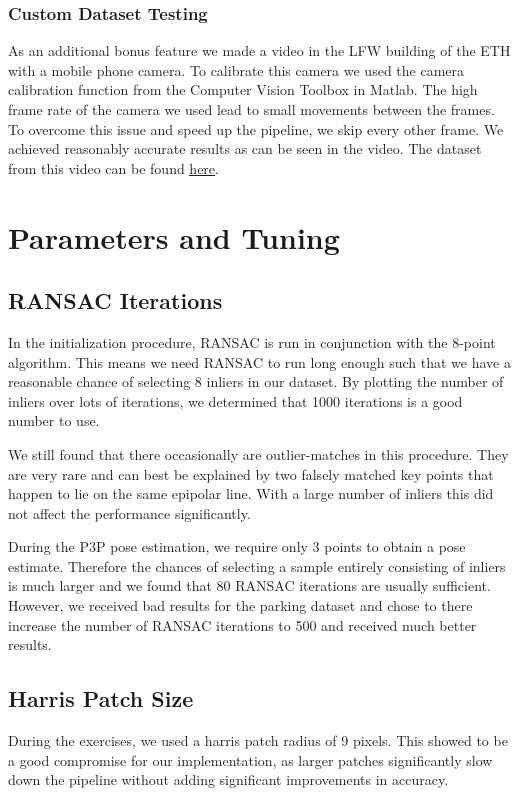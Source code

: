 \documentclass[11pt]{article}
\begin{document}
\subsubsection{Custom Dataset Testing}
As an additional bonus feature we made a video in the LFW building of the ETH with a mobile phone camera. To calibrate this camera we used the camera calibration function from the Computer Vision Toolbox in Matlab. The high frame rate of the camera we used lead to small movements between the frames. To overcome this issue and speed up the pipeline, we skip every other frame. We achieved reasonably accurate results as can be seen in the video. The dataset from this video can be found \href{https://www.dropbox.com/sh/mhrpmllsdomer5p/AABb7Gz0JGaK-FXOYEMNzeGfa?dl=0}{\underline{here}}.

\section{Parameters and Tuning}
\subsection{RANSAC Iterations}
In the initialization procedure, RANSAC is run in conjunction with the 8-point algorithm. This means we need RANSAC to run long enough such that we have a reasonable chance of selecting 8 inliers in our dataset. By plotting the number of inliers over lots of iterations, we determined that 1000 iterations is a good number to use.

We still found that there occasionally are outlier-matches in this procedure. They are very rare and can best be explained by two falsely matched key points that happen to lie on the same epipolar line. With a large number of inliers this did not affect the performance significantly.

During the P3P pose estimation, we require only 3 points to obtain a pose estimate. Therefore the chances of selecting a sample entirely consisting of inliers is much larger and we found that 80 RANSAC iterations are usually sufficient. However, we received bad results for the parking dataset and chose to there increase the number of RANSAC iterations to 500 and received much better results.

\subsection{Harris Patch Size}
During the exercises, we used a harris patch radius of 9 pixels. This showed to be a good compromise for our implementation, as larger patches significantly slow down the pipeline without adding significant improvements in accuracy.
\end{document}
